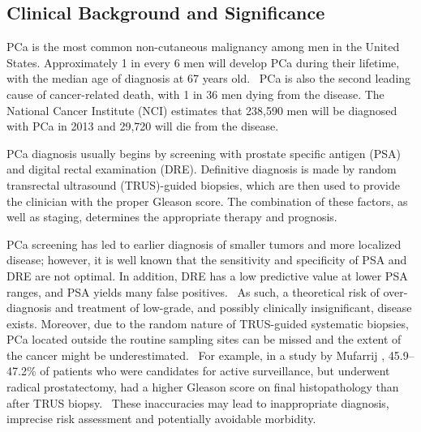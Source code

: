 ﻿\subsection{Clinical Background and Significance}
PCa is the most common non-cutaneous malignancy among men in the United States.
Approximately 1 in every 6 men will develop PCa during their lifetime, with the
median age of diagnosis at 67 years old.~\cite{Howlader2011} PCa is also the
second leading cause of cancer-related death, with 1 in 36 men dying from the
disease.  The National Cancer Institute (NCI) estimates that 238,590 men will
be diagnosed with PCa in 2013 and 29,720 will die from the
disease.~\cite{Howlader2011}

PCa diagnosis usually begins by screening with prostate specific antigen (PSA)
and digital rectal examination (DRE).  Definitive diagnosis is made by random
transrectal ultrasound (TRUS)-guided biopsies, which are then used to provide
the clinician with the proper Gleason score. The combination of these factors,
as well as staging, determines the appropriate therapy and prognosis. 

PCa screening has led to earlier diagnosis of smaller tumors and more localized
disease; however, it is well known that the sensitivity and specificity of PSA
and DRE are not optimal. In addition, DRE has a low predictive value at lower
PSA ranges, and PSA yields many false
positives.~\cite{Gosselaar2007,Gupta2013,Hricak2007} As such, a theoretical
risk of over-diagnosis and treatment of low-grade, and possibly clinically
insignificant, disease exists.  Moreover, due to the random nature of
TRUS-guided systematic biopsies, PCa located outside the routine sampling sites
can be missed and the extent of the cancer might be
underestimated.~\cite{Gupta2013,Cornud2012} For example, in a study by Mufarrij
\etal, 45.9--47.2\% of patients who were candidates for active surveillance,
but underwent radical prostatectomy, had a higher Gleason score on final
histopathology than after TRUS biopsy.~\cite{Mufarrij2010} These inaccuracies
may lead to inappropriate diagnosis, imprecise risk assessment and potentially
avoidable morbidity.

